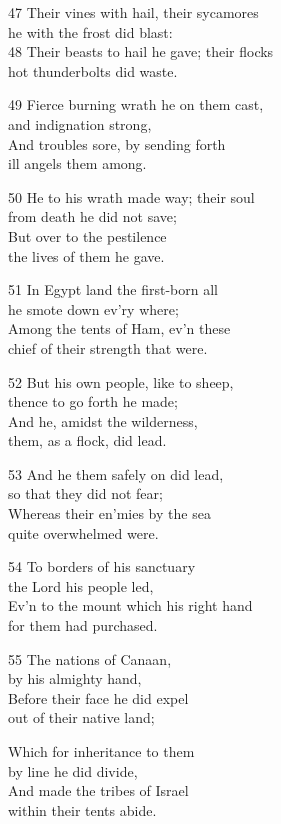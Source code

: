 47 Their vines with hail, their sycamores\\
he with the frost did blast:\\
48 Their beasts to hail he gave; their flocks\\
hot thunderbolts did waste.

49 Fierce burning wrath he on them cast,\\
and indignation strong,\\
And troubles sore, by sending forth\\
ill angels them among.

50 He to his wrath made way; their soul\\
from death he did not save;\\
But over to the pestilence\\
the lives of them he gave.

51 In Egypt land the first-born all\\
he smote down ev’ry where;\\
Among the tents of Ham, ev’n these\\
chief of their strength that were.

52 But his own people, like to sheep,\\
thence to go forth he made;\\
And he, amidst the wilderness,\\
them, as a flock, did lead.

53 And he them safely on did lead,\\
so that they did not fear;\\
Whereas their en’mies by the sea\\
quite overwhelmed were.

54 To borders of his sanctuary\\
the Lord his people led,\\
Ev’n to the mount which his right hand\\
for them had purchased.

55 The nations of Canaan,\\
by his almighty hand,\\
Before their face he did expel\\
out of their native land;

Which for inheritance to them\\
by line he did divide,\\
And made the tribes of Israel\\
within their tents abide.

